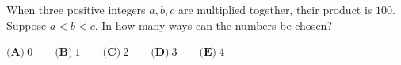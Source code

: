 When three positive integers $a,b,c$ are multiplied together, their product is $100$. Suppose $a<b<c$. In how many ways can the numbers be chosen?

$\textbf{(A)}\ 0\qquad\textbf{(B)}\ 1\qquad\textbf{(C)}\ 2\qquad\textbf{(D)}\ 3\qquad\textbf{(E)}\ 4$

